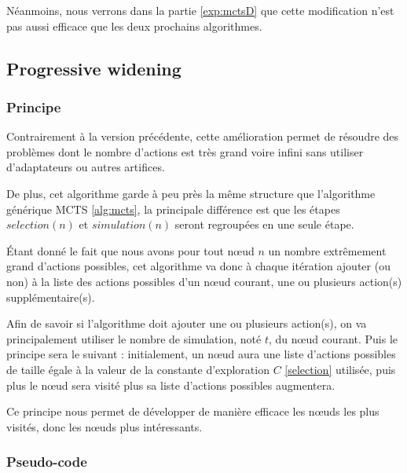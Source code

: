 \documentclass[pdftex,french, english]{article}	%
\begin{document}
		Néanmoins, nous verrons dans la partie \ref{exp:mctsD} que cette modification n'est pas aussi efficace que les deux prochains algorithmes.
	\subsection{Progressive widening} \label{pw}

		\subsubsection{Principe} \label{pw:principe}

		Contrairement à la version précédente, cette amélioration permet de résoudre des problèmes dont le nombre d'actions est très grand voire infini sans utiliser d'adaptateurs ou autres artifices.

		De plus, cet algorithme garde à peu près la même structure que l'algorithme générique MCTS \ref{alg:mcts}, la principale différence est que les étapes $selection(n)$ et $simulation(n)$ seront regroupées en une seule étape.

		Étant donné le fait que nous avons pour tout nœud $n$ un nombre extrêmement grand d'actions possibles, cet algorithme va donc à chaque itération ajouter (ou non) à la liste des actions possibles d'un nœud courant, une ou plusieurs action(s) supplémentaire(s).

		Afin de savoir si l'algorithme doit ajouter une ou plusieurs action(s), on va principalement utiliser le nombre de simulation, noté $t$, du nœud courant.
		Puis le principe sera le suivant : initialement, un nœud aura une liste d'actions possibles de taille égale à la valeur de la constante d'exploration $C$ \ref{selection} utilisée, puis plus le nœud sera visité plus sa liste d'actions possibles augmentera.

		Ce principe nous permet de développer de manière efficace les nœuds les plus visités, donc les nœuds plus intéressants.

		\subsubsection{Pseudo-code} \label{pw:code}
\end{document}
